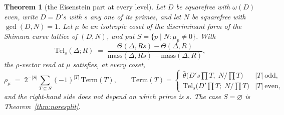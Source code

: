 \documentclass[11pt,reqno]{amsart}
\theoremstyle{plain}
\newtheorem{theorem}{Theorem}[section]
\theoremstyle{definition}
\begin{document}
\begin{theorem}[the Eisenstein part at every level]\label{thm:Ngeneral}
Let $D$ be squarefree with $\omega(D)$ even, write $D=D's$ with $s$ any one of its primes,
and let $N$ be squarefree with $\gcd(D,N)=1$. Let $\mu$ be an isotropic coset of the
discriminant form of the Shimura curve lattice of $(D,N)$, and put
$S=\{p\mid N:\mu_p\neq0\}$. With
\[
  \mathrm{Tel}_s(\Delta;R)\;=\;\frac{\Theta(\Delta,Rs)-\Theta(\Delta,R)}
                                    {\mathrm{mass}(\Delta,Rs)-\mathrm{mass}(\Delta,R)},
\]
the $\rho$-vector read at $\mu$ satisfies, at every coset,
\[
  \rho_\mu\;=\;2^{-\lvert S\rvert}\sum_{T\subseteq S}(-1)^{\lvert T\rvert}\,\mathrm{Term}(T),
  \qquad
  \mathrm{Term}(T)=
  \begin{cases}
    \bar\theta\bigl(D's{\textstyle\prod}T,\;N/{\textstyle\prod}T\bigr)
      & \lvert T\rvert\ \text{odd},\\[2pt]
    \mathrm{Tel}_s\bigl(D'{\textstyle\prod}T;\;N/{\textstyle\prod}T\bigr)
      & \lvert T\rvert\ \text{even},
  \end{cases}
\]
and the right-hand side does not depend on which prime is $s$. The case $S=\varnothing$ is
Theorem~\ref{thm:noresplit}.
\end{theorem}
\end{document}
